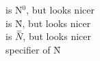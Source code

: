  is N$^0$, but looks nicer\\
 is \={N}, but looks nicer\\
 is $\stackrel{=}{N}$, but looks nicer\\
 specifier of \={N}
